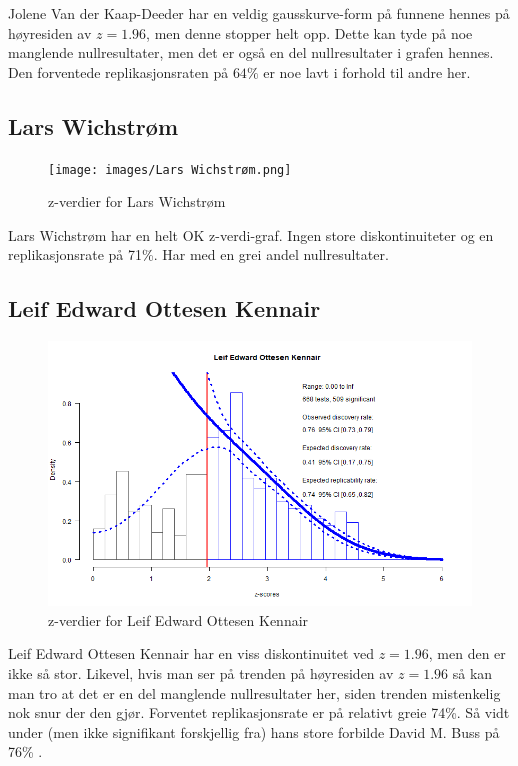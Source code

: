\documentclass[doc,norsk]{apa7}
\begin{document}
Jolene Van der Kaap-Deeder har en veldig gausskurve-form på funnene hennes på høyresiden av $z=1.96$, men denne stopper helt opp. Dette kan tyde på noe manglende nullresultater, men det er også en del nullresultater i grafen hennes. Den forventede replikasjonsraten på $64\%$ er noe lavt i forhold til andre her.

\subsection{Lars Wichstrøm}
\begin{figure}[h!]
    \centering
    \texttt{[image: images/Lars Wichstrøm.png]}
    \caption{z-verdier for Lars Wichstrøm}
\end{figure}

Lars Wichstrøm har en helt OK z-verdi-graf. Ingen store diskontinuiteter og en replikasjonsrate på 71\%. Har med en grei andel nullresultater.

\subsection{Leif Edward Ottesen Kennair}
\begin{figure}[h!]
    \centering
    \includegraphics[width=\textwidth]{images/Leif Edward Ottesen Kennair.png}
    \caption{z-verdier for Leif Edward Ottesen Kennair}
\end{figure}

Leif Edward Ottesen Kennair har en viss diskontinuitet ved $z=1.96$, men den er ikke så stor. Likevel, hvis man ser på trenden på høyresiden av $z=1.96$ så kan man tro at det er en del manglende nullresultater her, siden trenden mistenkelig nok snur der den gjør. Forventet replikasjonsrate er på relativt greie 74\%. Så vidt under (men ikke signifikant forskjellig fra) hans store forbilde David M. Buss på 76\% \parencite{z-curve-david-buss}.
\end{document}
